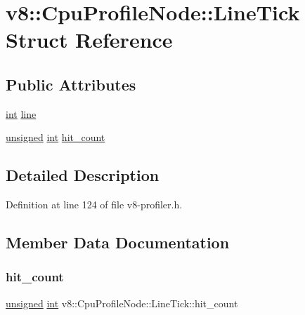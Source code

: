 \hypertarget{structv8_1_1CpuProfileNode_1_1LineTick}{}\section{v8\+:\+:Cpu\+Profile\+Node\+:\+:Line\+Tick Struct Reference}
\label{structv8_1_1CpuProfileNode_1_1LineTick}
\subsection*{Public Attributes}
\begin{DoxyCompactItemize}
\item 
\mbox{\hyperlink{classint}{int}} \mbox{\hyperlink{structv8_1_1CpuProfileNode_1_1LineTick_af96fbdefbc07b2c84cf41d74555626f6}{line}}
\item 
\mbox{\hyperlink{classunsigned}{unsigned}} \mbox{\hyperlink{classint}{int}} \mbox{\hyperlink{structv8_1_1CpuProfileNode_1_1LineTick_a62653fb1e6d381a5747d24b83aab1c1b}{hit\+\_\+count}}
\end{DoxyCompactItemize}


\subsection{Detailed Description}


Definition at line 124 of file v8-\/profiler.\+h.



\subsection{Member Data Documentation}
\mbox{\label{structv8_1_1CpuProfileNode_1_1LineTick_a62653fb1e6d381a5747d24b83aab1c1b}} 
\subsubsection{\texorpdfstring{hit\+\_\+count}{hit\_count}}
{\footnotesize\ttfamily \mbox{\hyperlink{classunsigned}{unsigned}} \mbox{\hyperlink{classint}{int}} v8\+::\+Cpu\+Profile\+Node\+::\+Line\+Tick\+::hit\+\_\+count}


